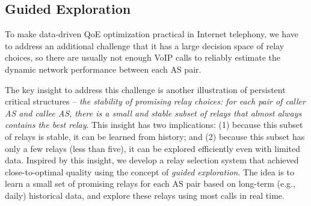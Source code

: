 

\subsection{Guided Exploration}
\label{subsec:overview:guided}

To make data-driven QoE optimization practical in Internet telephony,
we have to address an additional challenge that it has a 
large decision space of relay choices, so there 
are usually not enough VoIP calls to reliably estimate 
the dynamic network performance between each 
AS pair.

The key insight to address this challenge is  another
illustration of persistent critical structures --
{\em the stability of promising relay choices: for each pair of 
caller AS and callee AS, there is a small and 
stable subset of relays that almost always 
contains the best relay}. 
This insight has two implications: 
(1) because this subset of relays is stable, 
it can be learned from history; and 
(2) because this subset has only a few relays 
(less than five), it can be explored efficiently 
even with limited data.
Inspired by this insight, we develop a relay selection 
system that achieved close-to-optimal quality 
using the concept of {\em guided exploration}. 
The idea is to learn a small set of promising relays 
for each AS pair based on long-term (e.g., daily) 
historical data, and explore these relays using most
calls in real time.


